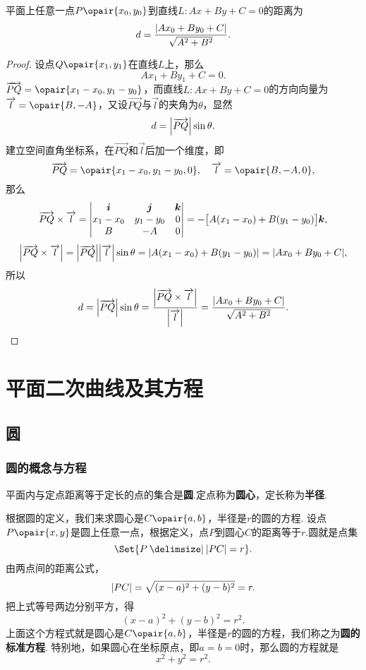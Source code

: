 \begin{example}\label{example:解析几何.平面直线外一点到该直线的距离问题}
平面上任意一点\(P\opair{x_0,y_0}\)到直线\(L: Ax+By+C=0\)的距离为\begin{equation}
d = \frac{\abs{A x_0 + B y_0 + C}}{\sqrt{A^2 + B^2}}.
\end{equation}
\begin{proof}
设点\(Q\opair{x_1,y_1}\)在直线\(L\)上，那么\[
A x_1 + B y_1 + C = 0.
\]\(\vec{PQ} = \opair{x_1 - x_0,y_1 - y_0}\)，而直线\(L: Ax+By+C=0\)的方向向量为\(\vec{l} = \opair{B,-A}\)，又设\(\vec{PQ}\)与\(\vec{l}\)的夹角为\(\theta\)，显然\[
d = \abs{\overrightarrow{PQ}} \sin\theta.
\]
建立空间直角坐标系，在\(\vec{PQ}\)和\(\vec{l}\)后加一个维度，即\[
\vec{PQ} = \opair{x_1 - x_0,y_1 - y_0,0},
\quad
\vec{l} = \opair{B,-A,0},
\]那么\[
\overrightarrow{PQ} \times \overrightarrow{l} = \begin{vmatrix}
\boldsymbol{i} & \boldsymbol{j} & \boldsymbol{k} \\
x_1 - x_0 & y_1 - y_0 & 0 \\
B & -A & 0
\end{vmatrix} = -\bigl[A(x_1 - x_0)+B(y_1 - y_0)\bigr] \boldsymbol{k},
\]\[
\abs{\overrightarrow{PQ} \times \overrightarrow{l}}
= \abs{\overrightarrow{PQ}} \abs{\overrightarrow{l}} \sin\theta
= \abs{A(x_1 - x_0)+B(y_1 - y_0)}
= \abs{A x_0 + B y_0 + C},
\]所以\[
d = \abs{\overrightarrow{PQ}} \sin\theta
= \frac{\abs{\overrightarrow{PQ} \times \overrightarrow{l}}}{\abs{\overrightarrow{l}}}
= \frac{\abs{A x_0 + B y_0 + C}}{\sqrt{A^2+B^2}}.
\qedhere
\]
\end{proof}
\end{example}

\section{平面二次曲线及其方程}
\subsection{圆}
\subsubsection{圆的概念与方程}
\begin{definition}
平面内与定点距离等于定长的点的集合是\textbf{圆}.定点称为\textbf{圆心}，定长称为\textbf{半径}.
\end{definition}

根据圆的定义，我们来求圆心是\(C\opair{a,b}\)，半径是\(r\)的圆的方程.
设点\(P\opair{x,y}\)是圆上任意一点，根据定义，点\(P\)到圆心\(C\)的距离等于\(r\).圆就是点集\[
\Set{ P \given \abs{PC} = r }.
\]由两点间的距离公式，\[
\abs{PC} = \sqrt{(x-a)^2+(y-b)^2} = r.
\]把上式等号两边分别平方，得\begin{equation}
(x-a)^2+(y-b)^2 = r^2.
\end{equation}上面这个方程式就是圆心是\(C\opair{a,b}\)，半径是\(r\)的圆的方程，我们称之为\textbf{圆的标准方程}.
特别地，如果圆心在坐标原点，即\(a=b=0\)时，那么圆的方程就是\begin{equation}
x^2+y^2 = r^2.
\end{equation}

